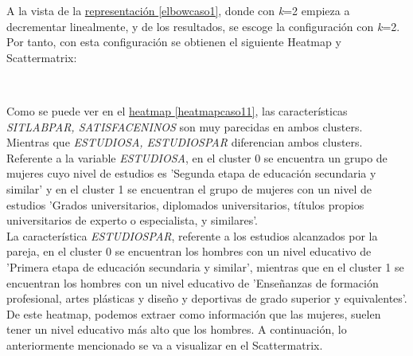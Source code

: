\documentclass[paper=a4, fontsize=12pt]{article} %
\numberwithin{equation}{section} %
\numberwithin{figure}{section} %
\numberwithin{table}{section} %
\begin{document}
A la vista de la \hyperref [elbowcaso1]{representación \ref*{elbowcaso1}}, donde con \textit{k}=2 empieza a decrementar linealmente, y de los resultados, se escoge la configuración con \textit{k}=2. \\

Por tanto, con esta configuración se obtienen el siguiente Heatmap y Scattermatrix:

\begin{figure}[H]
    \centering
    \mbox {
    }
\end{figure}

Como se puede ver en el \hyperref[heatmapcaso11]{heatmap \ref*{heatmapcaso11}}, las características \textit{SITLABPAR, SATISFACENINOS} son muy parecidas en ambos clusters. Mientras que \textit{ ESTUDIOSA, ESTUDIOSPAR} diferencian ambos clusters. \\

Referente a la variable \textit{ESTUDIOSA}, en el cluster 0 se encuentra un grupo de mujeres cuyo nivel de estudios es 'Segunda etapa de educación secundaria y similar' y en el cluster 1 se encuentran el grupo de mujeres con un nivel de estudios 'Grados universitarios, diplomados universitarios, títulos propios universitarios de experto o especialista, y similares'. \\

La característica \textit{ESTUDIOSPAR}, referente a los estudios alcanzados por la pareja, en el cluster 0 se encuentran los hombres con un nivel educativo de 'Primera etapa de educación secundaria y similar', mientras que en el cluster 1 se encuentran los hombres con un nivel educativo de 'Enseñanzas de formación profesional, artes plásticas y diseño y deportivas de grado superior y equivalentes'.\\

De este heatmap, podemos extraer como información que las mujeres, suelen tener un nivel educativo más alto que los hombres. A continuación, lo anteriormente mencionado se va a visualizar en el Scattermatrix.

\begin{figure}[H]
    \centering
    \mbox {
    }
\end{figure}
\end{document}
